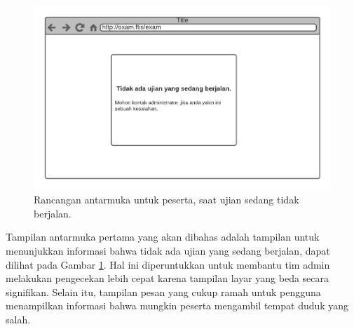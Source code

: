     \begin{figure}[ht]
        \centering
        \includegraphics[width=0.7\paperwidth]{Gambar/mockups/Mockup--Peserta - Blankstate.pdf}
        \caption{Rancangan antarmuka untuk peserta, saat ujian sedang tidak berjalan.}
        \label{fig:mockup_peserta_blankstate}
    \end{figure}
     Tampilan antarmuka pertama yang akan dibahas adalah tampilan untuk
     menunjukkan informasi bahwa tidak ada ujian yang sedang berjalan, dapat
     dilihat pada Gambar \ref{fig:mockup_peserta_blankstate}. Hal ini
     diperuntukkan untuk membantu tim admin melakukan pengecekan lebih cepat
     karena tampilan layar yang beda secara signifikan. Selain itu, tampilan
     pesan yang cukup ramah untuk pengguna menampilkan informasi bahwa mungkin
     peserta mengambil tempat duduk yang salah.

